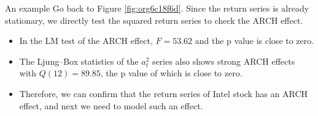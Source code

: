 \documentclass[presentation,10pt]{beamer}
\begin{document}
\begin{frame}[label={sec:orgc0a598a}]{An example}
Go back to Figure \ref{fig:org6c18f6d}. Since the return series is
already stationary, we directly test the squared return series to
check the ARCH effect. 

\begin{itemize}
\item In the LM test of the ARCH effect, \(F = 53.62\) and the p value is
close to zero.
\item The Ljung–Box statistics of the \(a^2_t\) series also
shows strong ARCH effects with \(Q(12) = 89.85\), the p value of which is
close to zero.
\item Therefore, we can confirm that the return series of
Intel stock has an ARCH effect, and next we need to model such an
effect.
\end{itemize}
\end{frame}
\end{document}
